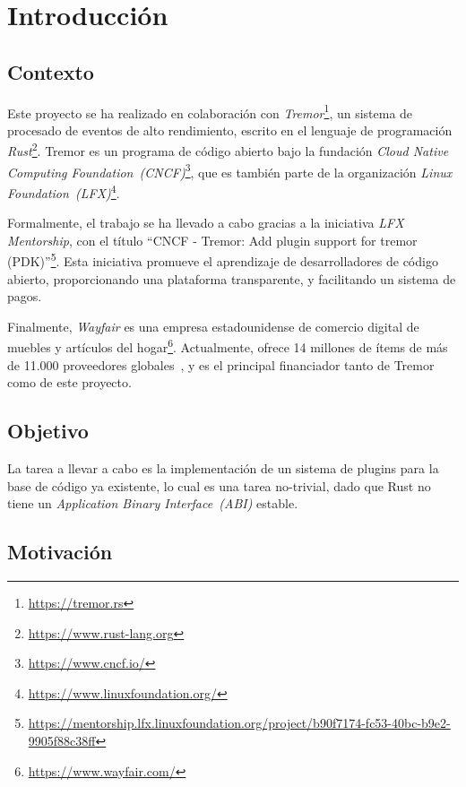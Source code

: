 
\chapter{Introducción}

\section{Contexto}

Este proyecto se ha realizado en colaboración con
\emph{Tremor}\footnote{\url{https://tremor.rs}}, un sistema de procesado de
eventos de alto rendimiento, escrito en el lenguaje de programación
\emph{Rust}\footnote{\url{https://www.rust-lang.org}}. Tremor es un programa de
código abierto bajo la fundación \emph{Cloud Native Computing
Foundation~(CNCF)}\footnote{\url{https://www.cncf.io/}}, que es también parte de
la organización \emph{Linux
Foundation~(LFX)}\footnote{\url{https://www.linuxfoundation.org/}}.

Formalmente, el trabajo se ha llevado a cabo gracias a la iniciativa \emph{LFX
Mentorship}, con el título ``CNCF - Tremor: Add plugin support for tremor
(PDK)''\footnote{\url{https://mentorship.lfx.linuxfoundation.org/project/b90f7174-fc53-40bc-b9e2-9905f88c38ff}}.
Esta iniciativa promueve el aprendizaje de desarrolladores de código abierto,
proporcionando una plataforma transparente, y facilitando un sistema de pagos.

Finalmente, \emph{Wayfair} es una empresa estadounidense de comercio digital de
muebles y artículos del hogar\footnote{\url{https://www.wayfair.com/}}.
Actualmente, ofrece 14 millones de ítems de más de 11.000 proveedores
globales~\cite{wayfairItems}, y es el principal financiador tanto de Tremor como
de este proyecto.

\section{Objetivo}

La tarea a llevar a cabo es la implementación de un sistema de plugins para la
base de código ya existente, lo cual es una tarea no-trivial, dado que Rust no
tiene un \emph{Application Binary Interface~(ABI)} estable.


\section{Motivación}

